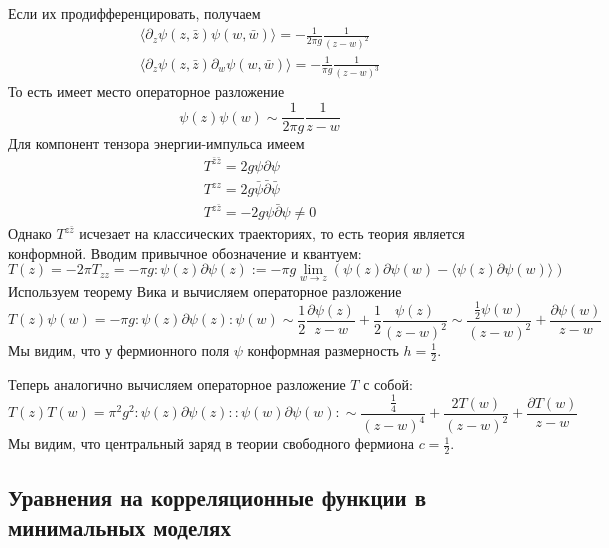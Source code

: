 \documentclass[a4paper,12pt]{article}
\theoremstyle{definition}
\theoremstyle{definition}
\theoremstyle{definition}
\begin{document}
Если их продифференцировать, получаем
\begin{eqnarray}
  \label{eq:294}
  \langle \partial_z \psi(z,\bar z) \psi(w,\bar w) \rangle=-\frac{1}{2\pi g} \frac{1}{(z-w)^2}\\
  \langle \partial_z \psi(z,\bar z) \partial_w \psi(w,\bar w) \rangle=-\frac{1}{\pi g} \frac{1}{(z-w)^3}
\end{eqnarray}
То есть имеет место операторное разложение
\begin{equation}
  \label{eq:295}
  \psi(z)\psi(w)\sim \frac{1}{2\pi g} \frac{1}{z-w}
\end{equation}
Для компонент тензора энергии-импульса имеем
\begin{eqnarray}
  \label{eq:296}
  T^{\bar z\bar z} =2g\psi\partial \psi\\
  T^{ z z} =2g\bar \psi\bar\partial \bar \psi\\
  T^{ z\bar z} =-2g\psi\bar\partial \psi\neq 0
\end{eqnarray}
Однако $T^{z\bar z}$ исчезает на классических траекториях, то есть теория является конформной.
Вводим привычное обозначение и квантуем:
\begin{equation}
  \label{eq:297}
  T(z)=-2\pi T_{zz}=-\pi g :\psi(z) \partial \psi(z):=-\pi g\lim_{w\to z}(\psi(z)\partial \psi(w) -\langle\psi(z) \partial \psi(w)\rangle)
\end{equation}
Используем теорему Вика и вычисляем операторное разложение
\begin{equation}
  \label{eq:298}
  T(z) \psi(w)=-\pi g:\psi(z)\partial \psi(z) :\psi(w) \sim \frac{1}{2}\frac{\partial \psi(z)}{z-w} +\frac{1}{2}\frac{\psi(z)}{(z-w)^2} \sim \frac{\frac{1}{2} \psi(w)}{(z-w)^2} +\frac{\partial \psi(w)}{z-w}
\end{equation}
Мы видим, что у фермионного поля $\psi$ конформная размерность $h=\frac{1}{2}$. 

Теперь аналогично вычисляем операторное разложение $T$ с собой:
\begin{equation}
  \label{eq:299}
  T(z)T(w)=\pi^2 g^2 :\psi(z)\partial \psi(z)::\psi(w)\partial \psi(w): \sim \frac{\frac{1}{4}}{(z-w)^4} +\frac{2T(w)}{(z-w)^2} +\frac{\partial T(w)}{z-w}
\end{equation}
Мы видим, что центральный заряд в теории свободного фермиона $c=\frac{1}{2}$.


\subsection{Уравнения на корреляционные функции в минимальных моделях}
\label{sec:null-fields}
\end{document}
